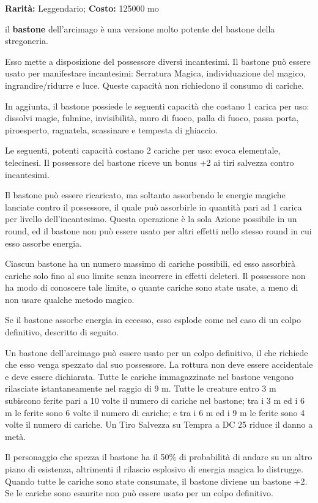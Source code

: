 \begin{multicols}{2}
\textbf{Rarità:} Leggendario; \textbf{Costo:} 125000 mo

il \textbf{bastone} dell'arcimago è una versione molto potente del bastone della stregoneria.

Esso mette a disposizione del possessore diversi incantesimi. Il bastone può essere usato per manifestare incantesimi: Serratura Magica, individuazione del magico, ingrandire/ridurre e luce. Queste capacità non richiedono il consumo di cariche.

In aggiunta, il bastone possiede le seguenti capacità che costano 1 carica per uso: dissolvi magie, fulmine, invisibilità, muro di fuoco, palla di fuoco, passa porta, piroesperto, ragnatela, scassinare e tempesta di ghiaccio.

Le seguenti, potenti capacità costano 2 cariche per uso: evoca elementale, telecinesi. Il possessore del bastone riceve un bonus +2 ai tiri salvezza contro incantesimi.

Il bastone può essere ricaricato, ma soltanto assorbendo le energie magiche lanciate contro il possessore, il quale può assorbirle in quantità pari ad 1 carica per livello dell'incantesimo. Questa operazione è la sola Azione possibile in un round, ed il bastone non può essere usato per altri effetti nello stesso round in cui esso assorbe energia.

Ciascun bastone ha un numero massimo di cariche possibili, ed esso assorbirà cariche solo fino al suo limite senza incorrere in effetti deleteri. Il possessore non ha modo di conoscere tale limite, o quante cariche sono state usate, a meno di non usare qualche metodo magico.

Se il bastone assorbe energia in eccesso, esso esplode come nel caso di un colpo definitivo, descritto di seguito.

Un bastone dell'arcimago può essere usato per un colpo definitivo, il che richiede che esso venga spezzato dal suo possessore. La rottura non deve essere accidentale e deve essere dichiarata. Tutte le cariche immagazzinate nel bastone vengono rilasciate istantaneamente nel raggio di 9 m. Tutte le creature entro 3 m subiscono ferite pari a 10 volte il numero di cariche nel bastone; tra i 3 m ed i 6 m le ferite sono 6 volte il numero di cariche; e tra i 6 m ed i 9 m le ferite sono 4 volte il numero di cariche. Un Tiro Salvezza su Tempra a DC 25 riduce il danno a metà.

Il personaggio che spezza il bastone ha il 50\% di probabilità di andare su un altro piano di esistenza, altrimenti il rilascio esplosivo di energia magica lo distrugge. Quando tutte le cariche sono state consumate, il bastone diviene un bastone +2. Se le cariche sono esaurite non può essere usato per un colpo definitivo.


\end{multicols}
